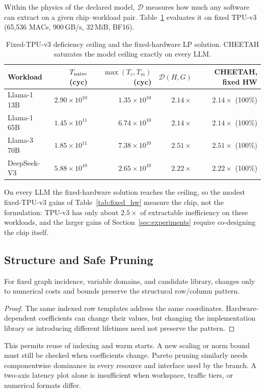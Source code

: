 Within the physics of the declared model, $\mathcal D$ measures how much any software can extract on a given chip--workload pair.
Table~\ref{tab:deficiency} evaluates it on fixed TPU-v3 (65,536 MACs, 900\,GB/s, 32\,MiB, BF16).
\begin{table}[h]
\centering\small
\caption{Fixed-TPU-v3 deficiency ceiling and the fixed-hardware LP solution.
CHEETAH saturates the model ceiling exactly on every LLM.}
\label{tab:deficiency}
\begin{tabular}{@{}lrrrr@{}}
\toprule
Workload & $T_{\rm naive}$ (cyc) & $\max(T_c,T_m)$ (cyc) & $\mathcal D(H,G)$ & CHEETAH, fixed HW \\
\midrule
Llama-1 13B & $2.90\times10^{10}$ & $1.35\times10^{10}$ & $2.14\times$ & $2.14\times$ (100\%) \\
Llama-1 65B & $1.45\times10^{11}$ & $6.74\times10^{10}$ & $2.14\times$ & $2.14\times$ (100\%) \\
Llama-3 70B & $1.85\times10^{11}$ & $7.38\times10^{10}$ & $2.51\times$ & $2.51\times$ (100\%) \\
DeepSeek-V3 & $5.88\times10^{10}$ & $2.65\times10^{10}$ & $2.22\times$ & $2.22\times$ (100\%) \\
\bottomrule
\end{tabular}
\end{table}
On every LLM the fixed-hardware solution reaches the ceiling, so the modest fixed-TPU-v3 gains of Table~\ref{tab:fixed_hw} measure the chip, not the formulation: TPU-v3 has only about $2.5\times$ of extractable inefficiency on these workloads, and the larger gains of Section~\ref{sec:experiments} require co-designing the chip itself.

\subsection{Structure and Safe Pruning}\label{app:invar}
\begin{proposition}\label{prop:invariance}
For fixed graph incidence, variable domains, and candidate library, changes only to numerical costs and bounds preserve the structural row/column pattern.
\end{proposition}
\begin{proof}
The same indexed row templates address the same coordinates.
Hardware-dependent coefficients can change their values, but changing the implementation library or introducing different lifetimes need not preserve the pattern.
\end{proof}
This permits reuse of indexing and warm starts.
A new scaling or norm bound must still be checked when coefficients change.
Pareto pruning similarly needs componentwise dominance in every resource and interface used by the branch.
A two-axis latency plot alone is insufficient when workspace, traffic tiers, or numerical formats differ.
